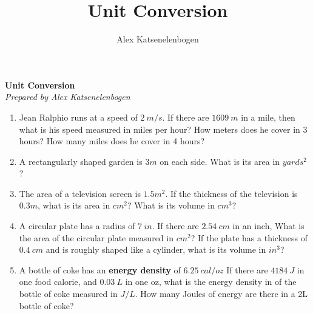 \documentclass{article}
\title{Unit Conversion}
\author{Alex Katsenelenbogen}
\begin{document}
\begin{center}
      \Large\textbf{Unit Conversion}\\
      \large\textit{Prepared by Alex Katsenelenbogen}
   \end{center}

\begin{enumerate}

\item Jean Ralphio runs at a speed of $2\ m/s$. If there are $1609\ m$ in a mile, then what is his speed measured in miles per hour? How meters does he cover in 3 hours? How many miles does he cover in 4 hours?

\item A rectangularly shaped garden is $3m$ on each side. What is its area in $yards^2$?

\item The area of a television screen is $1.5 m^2$. If the thickness of the television is $0.3m$, what is its area in $cm^2$? What is its volume in $cm^3$?

\item A circular plate has a radius of $7\ in$. If there are $2.54\ cm$ in an inch, What is the area of the circular plate measured in $cm^2$? If the plate has a thickness of $0.4\ cm$ and is roughly shaped like a cylinder, what is its volume 
in $in^3$?

\item A bottle of coke has an \textbf{energy density} of $6.25\ cal/oz$ If there are $4184\ J$ in one food calorie, and $0.03\ L$ in one oz, what is the energy density in of the bottle of coke measured in $J/L$. How many Joules of energy are there in a 2L bottle of coke?

\end{enumerate}
\end{document}
